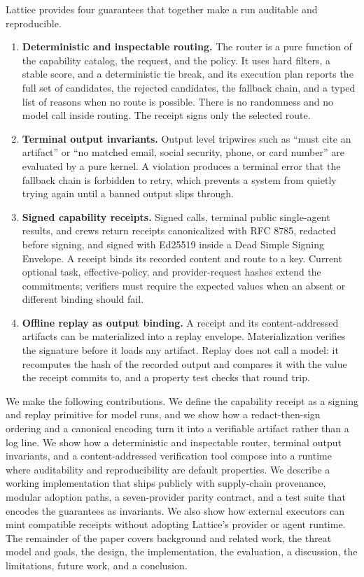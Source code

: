 \documentclass[conference]{IEEEtran}
\begin{document}
Lattice provides four guarantees that together make a run auditable and
reproducible.

\begin{enumerate}
\item \textbf{Deterministic and inspectable routing.} The router is a pure function
of the capability catalog, the request, and the policy. It uses hard filters, a
stable score, and a deterministic tie break, and its execution plan reports the full
set of candidates, the rejected candidates, the fallback chain, and a typed list of
reasons when no route is possible. There is no randomness and no model call inside
routing. The receipt signs only the selected route.
\item \textbf{Terminal output invariants.} Output level tripwires such as
``must cite an artifact'' or ``no matched email, social security, phone, or card
number'' are evaluated by a pure kernel. A violation produces a terminal error that the fallback chain is
forbidden to retry, which prevents a system from quietly trying again until a banned
output slips through.
\item \textbf{Signed capability receipts.} Signed calls, terminal public single-agent
results, and crews return receipts canonicalized with RFC 8785, redacted before
signing, and signed with Ed25519 inside a Dead Simple Signing Envelope. A receipt
binds its recorded content and route to a key. Current optional task, effective-policy,
and provider-request hashes extend the commitments; verifiers must require the
expected values when an absent or different binding should fail.
\item \textbf{Offline replay as output binding.} A receipt and its
content-addressed artifacts can be materialized into a replay envelope.
Materialization verifies the signature before it loads any artifact. Replay does not
call a model: it recomputes the hash of the recorded output and compares it with the
value the receipt commits to, and a property test checks that round trip.
\end{enumerate}

We make the following contributions. We define the capability receipt as a signing
and replay primitive for model runs, and we show how a redact-then-sign
ordering and a canonical encoding turn it into a verifiable artifact rather than a
log line. We show how a deterministic and inspectable router, terminal output
invariants, and a content-addressed verification tool compose into a runtime where
auditability and reproducibility are default properties. We describe a working
implementation that ships publicly with supply-chain provenance, modular adoption
paths, a seven-provider parity contract, and a test suite that encodes the
guarantees as invariants. We also show how external executors can mint compatible
receipts without adopting Lattice's provider or agent runtime. The remainder of the
paper covers background and related work, the threat model and goals, the design, the
implementation, the evaluation, a discussion, the limitations, future work, and a
conclusion.
\end{document}
